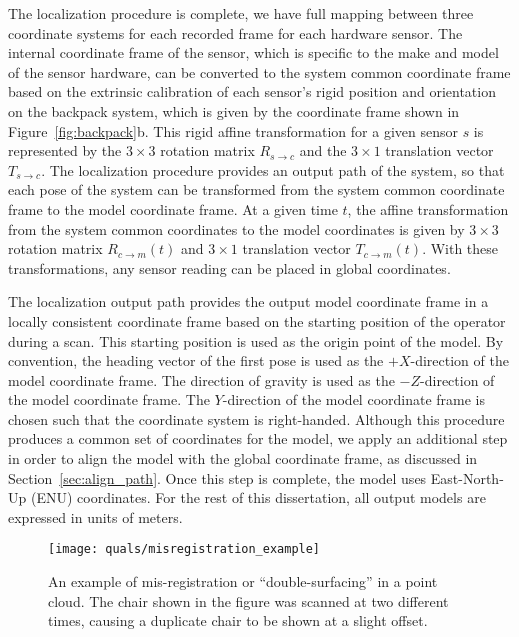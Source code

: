 \documentclass[12pt,onecolumn,oneside]{book}
\begin{document}
The localization procedure is complete, we have full mapping between three coordinate systems for each recorded frame for each hardware sensor.  The internal coordinate frame of the sensor, which is specific to the make and model of the sensor hardware, can be converted to the system common coordinate frame based on the extrinsic calibration of each sensor's rigid position and orientation on the backpack system, which is given by the coordinate frame shown in Figure~\ref{fig:backpack}b.  This rigid affine transformation for a given sensor $s$ is represented by the $3 \times 3$ rotation matrix $R_{s\rightarrow c}$ and the $3 \times 1$ translation vector $T_{s\rightarrow c}$.  The localization procedure provides an output path of the system, so that each pose of the system can be transformed from the system common coordinate frame to the model coordinate frame.  At a given time $t$, the affine transformation from the system common coordinates to the model coordinates is given by $3 \times 3$ rotation matrix $R_{c\rightarrow m}(t)$ and $3 \times 1$ translation vector $T_{c\rightarrow m}(t)$.  With these transformations, any sensor reading can be placed in global coordinates.

The localization output path provides the output model coordinate frame in a locally consistent coordinate frame based on the starting position of the operator during a scan.  This starting position is used as the origin point of the model.  By convention, the heading vector of the first pose is used as the $+X$-direction of the model coordinate frame.  The direction of gravity is used as the $-Z$-direction of the model coordinate frame.  The $Y$-direction of the model coordinate frame is chosen such that the coordinate system is right-handed.  Although this procedure produces a common set of coordinates for the model, we apply an additional step in order to align the model with the global coordinate frame, as discussed in Section~\ref{sec:align_path}.  Once this step is complete, the model uses East-North-Up (ENU) coordinates.  For the rest of this dissertation, all output models are expressed in units of meters.

\begin{figure}
	\centerline{\texttt{[image: quals/misregistration\_example]}}
	\caption[An example of mis-registration or ``double-surfacing'' in a point cloud.]{An example of mis-registration or ``double-surfacing'' in a point cloud.   The chair shown in the figure was scanned at two different times, causing a duplicate chair to be shown at a slight offset.}
	\label{fig:double_surface}
\end{figure}
\end{document}
